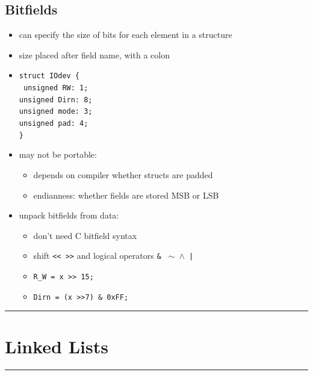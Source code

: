 \documentclass[10pt, multicolumn, a4paper]{article}
\begin{document}
\begin{multicols}{2}
	\subsection*{Bitfields}
	\begin{itemize}
	\item can specify the size of bits for each element in a structure
	\item size placed after field name, with a colon
	\item \verb|struct IOdev {| \\
		\texttt{\hspace*{5mm} unsigned RW: 1; \\ \hspace*{5mm} unsigned Dirn: 8; \\
		\hspace*{5mm} unsigned mode: 3; \\ \hspace*{5mm} unsigned pad: 4;} \\ \verb|}|
	\item may not be portable:
		\begin{itemize}
		\item depends on compiler whether structs are padded
		\item endianness: whether fields are stored MSB or LSB
		\end{itemize}
	\item unpack bitfields from data: 
		\begin{itemize}
		\item don't need C bitfield syntax
		\item shift \verb|<< >>| and logical operators \verb|&| \texttt{ $\sim$ $\wedge$ |}
		\item \verb|R_W = x >> 15;|
		\item \verb|Dirn = (x >>7) & 0xFF;|
		\end{itemize}
	\end{itemize}

\end{multicols}

\setcounter{section}{5}
\hrule
\section{Linked Lists}
\hrule 
\end{document}

